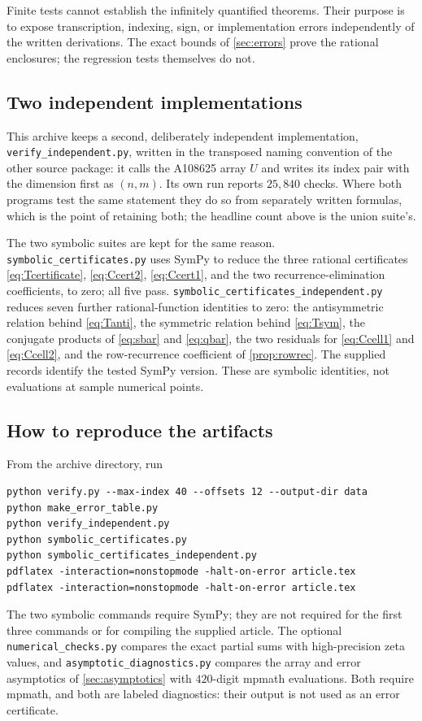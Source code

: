 \documentclass[11pt,letterpaper]{article}
\numberwithin{equation}{section}
\theoremstyle{definition}
\begin{document}
Finite tests cannot establish the infinitely quantified theorems. Their
purpose is to expose transcription, indexing, sign, or implementation
errors independently of the written derivations. The exact bounds of
\cref{sec:errors} prove the rational enclosures; the regression tests
themselves do not.

\subsection{Two independent implementations}\label{sec:twoimpl}

This archive keeps a second, deliberately independent implementation,
\texttt{verify\_independent.py}, written in the transposed naming
convention of the other source package: it calls the A108625 array $U$
and writes its index pair with the dimension first as $(n,m)$. Its own
run reports $25{,}840$ checks. Where both programs test the same
statement they do so from separately written formulas, which is the
point of retaining both; the headline count above is the union suite's.

The two symbolic suites are kept for the same reason.
\texttt{symbolic\_certificates.py} uses SymPy to reduce the three
rational certificates \eqref{eq:Tcertificate}, \eqref{eq:Ccert2},
\eqref{eq:Ccert1}, and the two recurrence-elimination coefficients, to
zero; all five pass. \texttt{symbolic\_certificates\_independent.py}
reduces seven further rational-function identities to zero: the
antisymmetric relation behind \eqref{eq:Tanti}, the symmetric relation
behind \eqref{eq:Tsym}, the conjugate products of \eqref{eq:sbar} and
\eqref{eq:qbar}, the two residuals for \eqref{eq:Ccell1} and
\eqref{eq:Ccell2}, and the row-recurrence coefficient of
\cref{prop:rowrec}. The supplied records identify the tested SymPy
version. These are symbolic identities, not evaluations at sample
numerical points.

\subsection{How to reproduce the artifacts}

From the archive directory, run
\begin{verbatim}
python verify.py --max-index 40 --offsets 12 --output-dir data
python make_error_table.py
python verify_independent.py
python symbolic_certificates.py
python symbolic_certificates_independent.py
pdflatex -interaction=nonstopmode -halt-on-error article.tex
pdflatex -interaction=nonstopmode -halt-on-error article.tex
\end{verbatim}
The two symbolic commands require SymPy; they are not required for the
first three commands or for compiling the supplied article. The optional
\texttt{numerical\_checks.py} compares the exact partial sums with
high-precision zeta values, and \texttt{asymptotic\_diagnostics.py}
compares the array and error asymptotics of \cref{sec:asymptotics} with
$420$-digit mpmath evaluations. Both require mpmath, and both are
labeled diagnostics: their output is not used as an error certificate.
\end{document}
